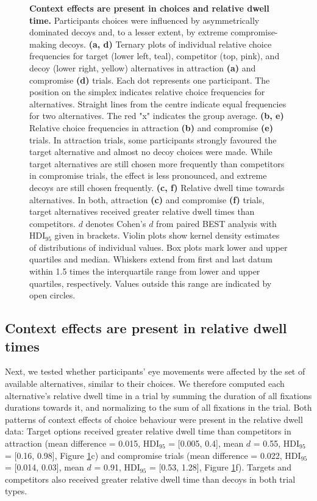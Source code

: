 \documentclass[11pt, a4paper]{article}
\begin{document}
\begin{figure}[bt!]
\begin{centering}
\caption{\textbf{Context effects are present in choices and relative dwell time.} Participants choices were influenced by asymmetrically dominated decoys and, to a lesser extent, by extreme compromise-making decoys. \textbf{(a, d)} Ternary plots of individual relative choice frequencies for target (lower left, teal), competitor (top, pink), and decoy (lower right, yellow) alternatives in attraction \textbf{(a)} and compromise \textbf{(d)} trials. Each dot represents one participant. The position on the simplex indicates relative choice frequencies for alternatives. Straight lines from the centre indicate equal frequencies for two alternatives. The red "x" indicates the group average. \textbf{(b, e)} Relative choice frequencies in attraction \textbf{(b)} and compromise \textbf{(e)} trials. In attraction trials, some participants strongly favoured the target alternative and almost no decoy choices were made. While target alternatives are still chosen more frequently than competitors in compromise trials, the effect is less pronounced, and extreme decoys are still chosen frequently. \textbf{(c, f)} Relative dwell time towards alternatives. In both, attraction \textbf{(c)} and compromise \textbf{(f)} trials, target alternatives received greater relative dwell times than competitors. $d$ denotes Cohen's $d$ from paired BEST analysis with HDI$_{95}$ given in brackets. Violin plots show kernel density estimates of distributions of individual values. Box plots mark lower and upper quartiles and median. Whiskers extend from first and last datum within 1.5 times the interquartile range from lower and upper quartiles, respectively. Values outside this range are indicated by open circles.}
\label{fig:cfx}
\end{centering}
\end{figure}

\subsection*{Context effects are present in relative dwell times}

Next, we tested whether participants' eye movements were affected by the set of available alternatives, similar to their choices. We therefore computed each alternative's relative dwell time in a trial by summing the duration of all fixations durations towards it, and normalizing to the sum of all fixations in the trial. Both patterns of context effects of choice behaviour were present in the relative dwell data: Target options received greater relative dwell time than competitors in attraction (mean difference = 0.015, HDI$_{95}$ = [0.005, 0.4], mean $d$ = 0.55, HDI$_{95}$  = [0.16, 0.98], Figure \ref{fig:cfx}c) and compromise trials (mean difference = 0.022, HDI$_{95}$  = [0.014, 0.03], mean $d$ = 0.91, HDI$_{95}$  = [0.53, 1.28], Figure \ref{fig:cfx}f). Targets and competitors also received greater relative dwell time than decoys in both trial types.
\end{document}
